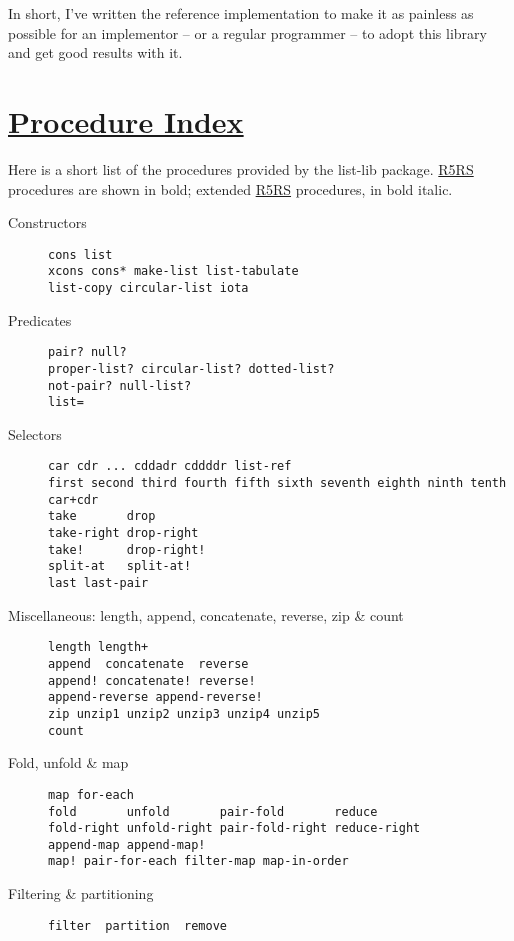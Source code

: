 In short, I've written the reference implementation to make it as
painless as possible for an implementor -- or a regular programmer -- to
adopt this library and get good results with it.

\section{\texorpdfstring{\href{}{Procedure
Index}}{Procedure Index}}\label{procedure-index}

Here is a short list of the procedures provided by the list-lib package.
\protect\hyperlink{R5RS}{R5RS} procedures are shown in {bold}; extended
\protect\hyperlink{R5RS}{R5RS} procedures, in {bold italic}.

\begin{description}
\item[ Constructors ]
\begin{verbatim}
cons list
xcons cons* make-list list-tabulate 
list-copy circular-list iota
\end{verbatim}
\item[ Predicates ]
\begin{verbatim}
pair? null?
proper-list? circular-list? dotted-list? 
not-pair? null-list?
list=
\end{verbatim}
\item[ Selectors ]
\begin{verbatim}
car cdr ... cddadr cddddr list-ref
first second third fourth fifth sixth seventh eighth ninth tenth
car+cdr
take       drop
take-right drop-right
take!      drop-right! 
split-at   split-at! 
last last-pair
\end{verbatim}
\item[ Miscellaneous: length, append, concatenate, reverse, zip \& count
]
\begin{verbatim}
length length+
append  concatenate  reverse
append! concatenate! reverse!
append-reverse append-reverse!
zip unzip1 unzip2 unzip3 unzip4 unzip5
count
\end{verbatim}
\item[ Fold, unfold \& map ]
\begin{verbatim}
map for-each
fold       unfold       pair-fold       reduce 
fold-right unfold-right pair-fold-right reduce-right 
append-map append-map!
map! pair-for-each filter-map map-in-order
\end{verbatim}
\item[ Filtering \& partitioning ]
\begin{verbatim}
filter  partition  remove

\end{verbatim}
\end{description}

